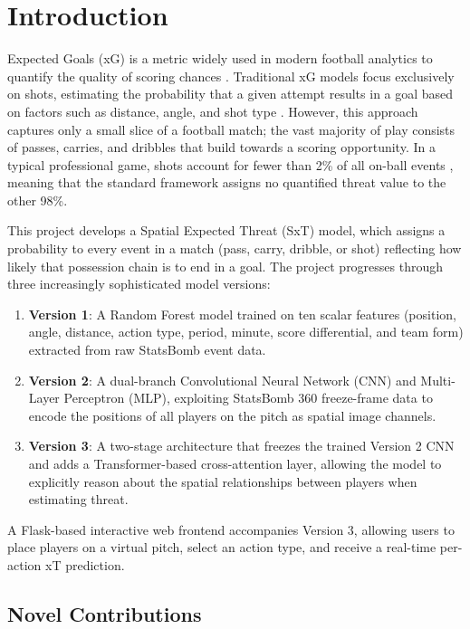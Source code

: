 \chapter{Introduction}\label{ch:intro}

Expected Goals (xG) is a metric widely used in modern football analytics to quantify the quality of scoring chances \cite{rathke2017,statsbomb2018}. Traditional xG models focus exclusively on shots, estimating the probability that a given attempt results in a goal based on factors such as distance, angle, and shot type \cite{lucey2015}. However, this approach captures only a small slice of a football match; the vast majority of play consists of passes, carries, and dribbles that build towards a scoring opportunity. In a typical professional game, shots account for fewer than 2\% of all on-ball events \cite{pappalardo2019}, meaning that the standard framework assigns no quantified threat value to the other 98\%.

This project develops a Spatial Expected Threat (SxT) model, which assigns a probability to every event in a match (pass, carry, dribble, or shot) reflecting how likely that possession chain is to end in a goal. The project progresses through three increasingly sophisticated model versions:

\begin{enumerate}
    \item \textbf{Version 1}: A Random Forest model trained on ten scalar features (position, angle, distance, action type, period, minute, score differential, and team form) extracted from raw StatsBomb event data.
    \item \textbf{Version 2}: A dual-branch Convolutional Neural Network (CNN) and Multi-Layer Perceptron (MLP), exploiting StatsBomb 360 freeze-frame data to encode the positions of all players on the pitch as spatial image channels.
    \item \textbf{Version 3}: A two-stage architecture that freezes the trained Version 2 CNN and adds a Transformer-based cross-attention layer, allowing the model to explicitly reason about the spatial relationships between players when estimating threat.
\end{enumerate}

A Flask-based interactive web frontend accompanies Version 3, allowing users to place players on a virtual pitch, select an action type, and receive a real-time per-action xT prediction.

\section{Novel Contributions}


